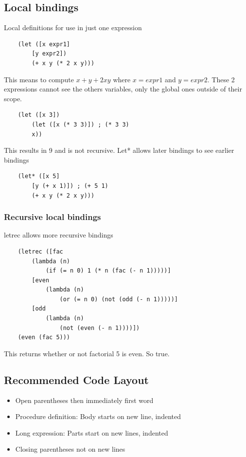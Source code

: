 \documentclass[12pt]{article}
\begin{document}
\subsection{Local bindings}

Local definitions for use in just one expression

\begin{lstlisting}
	(let ([x expr1]
		[y expr2])
		(+ x y (* 2 x y)))
\end{lstlisting}
This means to compute $x+y+2xy$ where $x=expr1$ and $y=expr2$. These 2 expressions cannot see the others variables, only the global ones outside of their scope.
\begin{lstlisting}
	(let ([x 3])
		(let ([x (* 3 3)]) ; (* 3 3)
		x))
\end{lstlisting}
This results in 9 and is not recursive. Let* allows later bindings to see earlier bindings
\begin{lstlisting}
	(let* ([x 5]
		[y (+ x 1)]) ; (+ 5 1)
		(+ x y (* 2 x y)))
\end{lstlisting}
\subsubsection{Recursive local bindings}

letrec allows more recursive bindings

\begin{lstlisting}
	(letrec ([fac
		(lambda (n)
			(if (= n 0) 1 (* n (fac (- n 1)))))]
		[even
			(lambda (n)
				(or (= n 0) (not (odd (- n 1)))))]
		[odd
			(lambda (n)
				(not (even (- n 1))))])
	(even (fac 5))) 
\end{lstlisting}
This returns whether or not factorial 5 is even. So true.

\subsection{Recommended Code Layout}

\begin{itemize}
	\item{Open parentheses then immediately first word}
	\item{Procedure definition: Body starts on new line, indented}
	\item{Long expression: Parts start on new lines, indented}
	\item{Closing parentheses not on new lines}
\end{itemize}

\newpage
\end{document}
